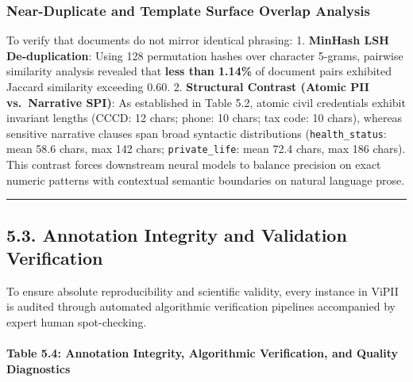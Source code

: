 \documentclass[
]{article}
\begin{document}
\subsubsection{Near-Duplicate and Template Surface Overlap
Analysis}\label{near-duplicate-and-template-surface-overlap-analysis}

To verify that documents do not mirror identical phrasing: 1.
\textbf{MinHash LSH De-duplication}: Using 128 permutation hashes over
character 5-grams, pairwise similarity analysis revealed that
\textbf{less than 1.14\%} of document pairs exhibited Jaccard similarity
exceeding \(0.60\). 2. \textbf{Structural Contrast (Atomic PII
vs.~Narrative SPI)}: As established in Table 5.2, atomic civil
credentials exhibit invariant lengths (CCCD: 12 chars; phone: 10 chars;
tax code: 10 chars), whereas sensitive narrative clauses span broad
syntactic distributions (\texttt{health\_status}: mean 58.6 chars, max
142 chars; \texttt{private\_life}: mean 72.4 chars, max 186 chars). This
contrast forces downstream neural models to balance precision on exact
numeric patterns with contextual semantic boundaries on natural language
prose.

\begin{center}\rule{0.5\linewidth}{0.5pt}\end{center}

\subsection{5.3. Annotation Integrity and Validation
Verification}\label{annotation-integrity-and-validation-verification}

To ensure absolute reproducibility and scientific validity, every
instance in ViPII is audited through automated algorithmic verification
pipelines accompanied by expert human spot-checking.

\paragraph{Table 5.4: Annotation Integrity, Algorithmic Verification,
and Quality
Diagnostics}\label{table-5.4-annotation-integrity-algorithmic-verification-and-quality-diagnostics}
\end{document}
